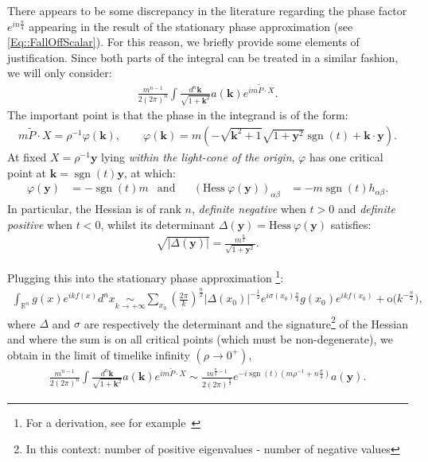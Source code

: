 \documentclass[a4paper, 10pt]{article}
\theoremstyle{remark}
\newcommand{\y}{\bm{y}}
\newcommand{\R}{\mathbb{R}}
\newcommand{\scal}{\cdot} %
\newcommand{\smallo}[1]{\textrm{o(}#1\textrm{)}}
\DeclareMathOperator{\sgn}{sgn}
\begin{document}
There appears to be some discrepancy in the literature regarding the phase factor $e^{in\frac{\pi}{4}}$ appearing in the result of the stationary phase approximation (see \eqref{Eq::FallOffScalar}). For this reason, we briefly provide some elements of justification. Since both parts of the integral can be treated in a similar fashion, we will only consider:
\begin{align}
    \frac{m^{n-1}}{2 (2\pi)^n}\int \frac{d^{n}\bm{k}}{\sqrt{1 + \bm{k}^2}} a(\bm{k}) e^{i m \tilde{P} \scal X}.
\end{align}   
The important point is that the phase in the integrand is of the form:
\begin{align}
    m \tilde{P}\scal X = \rho^{-1}\varphi(\bm{k}), \qquad \varphi(\bm{k})=m(-\sqrt{\bm{k}^2+1}\sqrt{1+\bm{y}^2}\sgn(t) + \bm{k}\cdot\bm{y} ). 
\end{align} 
At fixed $X=\rho^{-1}\bm{y}$ lying \emph{within the light-cone of the origin}, $\varphi$ has one critical point at $\bm{k}=\sgn(t)\mathbf{y}$, at which:
\begin{align}
    \varphi(\y) &= - \sgn(t) m  &\textrm{and}&&
    \left(\textrm{Hess}~\varphi(\bm{y})\right)_{\alpha\beta}&=-m\sgn(t)h_{\alpha\beta}.
\end{align} 
In particular, the Hessian is of rank $n$, \emph{definite negative} when $t>0$ and \emph{definite positive} when $t<0$, whilst its determinant $\Delta(\bm{y})=\textrm{Hess}~\varphi(\bm{y})$ satisfies:
\begin{align}
     \sqrt{\lvert\Delta(\bm{y})\rvert}= \frac{m^\frac{n}{2}}{\sqrt{1+\bm{y}^2}}.
\end{align}


Plugging this into the stationary phase approximation \footnote{For a derivation, see for example~\cite[(S.P.) on p6]{Guillemin_Sternberg_1977}}:
%
\begin{align}
    \int_{\R^n} g(x) e^{ikf(x)} d^nx \underset{k \to+\infty}{\sim} \sum_{x_0} \left(\frac{2 \pi}{k} \right)^\frac{n}{2} |\Delta(x_0)|^{-\frac{1}{2}} e^{i \sigma(x_0) \frac{\pi}{4}} g(x_0) e^{ikf(x_0)} + \smallo{k^{-\frac{n}{2}}}, 
\end{align}
where $\Delta$ and $\sigma$ are respectively the determinant and the signature\footnote{In this context: number of positive eigenvalues - number of negative values} of the Hessian and where the sum is on all critical points (which must be non-degenerate), we obtain in the limit of timelike infinity $(\rho \to 0^+)$,
\begin{align}
     \frac{m^{n-1}}{2 (2\pi)^n}\int \frac{d^{n}\bm{k}}{\sqrt{1 + \bm{k}^2}} a(\bm{k}) e^{i m \tilde{P} \scal X} \sim \frac{m^{\frac{n}{2}-1}}{2(2\pi)^{\frac{n}{2}}}e^{-i \sgn(t) \left( m\rho^{-1} + n\frac{\pi}{4} \right)} a(\bm{y}).
\end{align}
\end{document}
